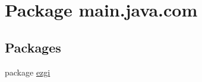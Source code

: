 \hypertarget{namespacemain_1_1java_1_1com}{}\section{Package main.\+java.\+com}
\label{namespacemain_1_1java_1_1com}
\subsection*{Packages}
\begin{DoxyCompactItemize}
\item 
package \hyperlink{namespacemain_1_1java_1_1com_1_1ezgi}{ezgi}
\end{DoxyCompactItemize}
